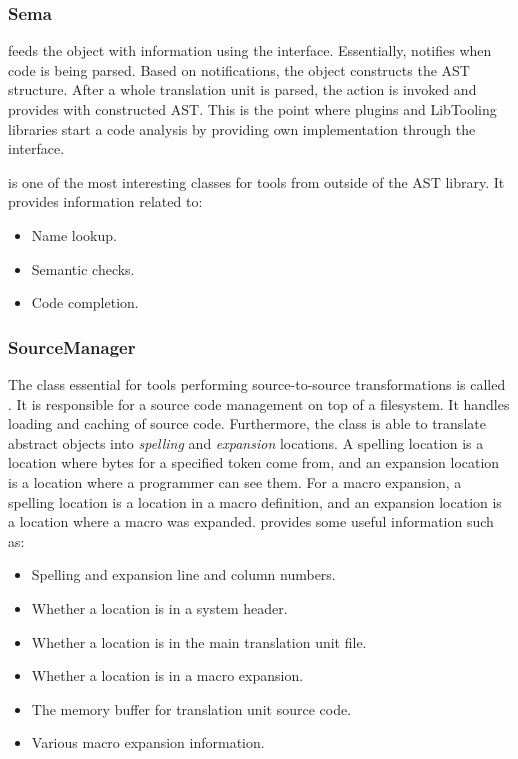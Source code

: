 \subsubsection{Sema}
 feeds the  object with information using the  interface. Essentially,  notifies  when code is being parsed. Based on notifications, the  object constructs the AST structure. After a whole translation unit is parsed, the  action is invoked and  provides  with constructed AST. This is the point where plugins and LibTooling libraries start a code analysis by providing own  implementation through the  interface.

 is one of the most interesting classes for tools from outside of the AST library. It provides information related to:

\begin{itemize}
\item Name lookup.
\item Semantic checks.
\item Code completion.
\end{itemize}

\subsubsection{SourceManager}
The class essential for tools performing source-to-source transformations is called . It is responsible for a source code management on top of a filesystem. It handles loading and caching of source code. Furthermore, the class is able to translate abstract  objects into \emph{spelling} and \emph{expansion} locations. A spelling location is a location where bytes for a specified token come from, and an expansion location is a location where a programmer can see them. For a macro expansion, a spelling location is a location in a macro definition, and an expansion location is a location where a macro was expanded.  provides some useful information such as:

\begin{itemize}
\item Spelling and expansion line and column numbers.
\item Whether a location is in a system header.
\item Whether a location is in the main translation unit file.
\item Whether a location is in a macro expansion.
\item The memory buffer for translation unit source code.
\item Various macro expansion information.
\end{itemize}

